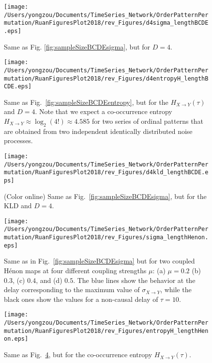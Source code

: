 \documentclass[aps,pre,superscriptaddress,floats,11pt]{revtex4}
\begin{document}
\begin{figure}[htb]
	\centering
	\texttt{[image: /Users/yongzou/Documents/TimeSeries\_Network/OrderPatternPermutation/RuanFiguresPlot2018/rev\_Figures/d4sigma\_lengthBCDE.eps]}
\caption{Same as Fig. \ref{fig:sampleSizeBCDEsigma}, but for $D = 4$.   \label{fig:d4sampleSizeBCDEsigma}}
\end{figure}

\begin{figure}[htb]
	\centering
	\texttt{[image: /Users/yongzou/Documents/TimeSeries\_Network/OrderPatternPermutation/RuanFiguresPlot2018/rev\_Figures/d4entropyH\_lengthBCDE.eps]}
\caption{Same as Fig.~\ref{fig:sampleSizeBCDEentropy}, but for the $H_{X\to Y}(\tau)$ and $D=4$. Note that we expect a co-occurrence entropy $H_{X \to Y} \approx \log_2 (4!) \approx 4.585$ for two series of ordinal patterns that are obtained from two independent identically distributed noise processes. \label{fig:d4sampleSizeBCDEentropy}}
\end{figure}

\begin{figure}
	\centering
	\texttt{[image: /Users/yongzou/Documents/TimeSeries\_Network/OrderPatternPermutation/RuanFiguresPlot2018/rev\_Figures/d4kld\_lengthBCDE.eps]}
\caption{(Color online) Same as Fig.~\ref{fig:sampleSizeBCDEsigma}, but for the KLD and $D = 4$.  \label{fig:d4sampleSizeBCDEkld}}
\end{figure}



\begin{figure}[htb]
	\centering
	\texttt{[image: /Users/yongzou/Documents/TimeSeries\_Network/OrderPatternPermutation/RuanFiguresPlot2018/rev\_Figures/sigma\_lengthHenon.eps]}
\caption{Same as in Fig.~\ref{fig:sampleSizeBCDEsigma} but for two coupled H\'enon maps at four different coupling strengths $\mu$: (a) $\mu=0.2$ (b) $0.3$, (c) $0.4$, and (d) $0.5$. The blue lines show the behavior at the delay corresponding to the maximum value of $\sigma_{X\to Y}$, while the black ones show the values for a non-causal delay of $\tau=10$. \label{fig:sampleSizeHenonsigma}}
\end{figure}

\begin{figure}[htb]
	\centering
	\texttt{[image: /Users/yongzou/Documents/TimeSeries\_Network/OrderPatternPermutation/RuanFiguresPlot2018/rev\_Figures/entropyH\_lengthHenon.eps]}
\caption{Same as Fig.~\ref{fig:sampleSizeHenonsigma}, but for the co-occurrence entropy $H_{X\to Y}(\tau)$. \label{fig:sampleSizeHenonentropy}}
\end{figure}
\end{document}
